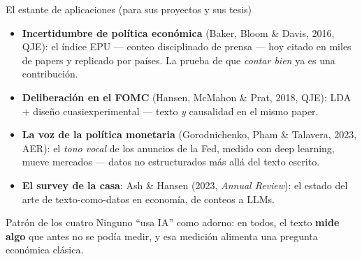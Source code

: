 \documentclass{beamer}
\newcommand{\1}{\mathbb{I}}
\begin{document}
\begin{frame}{El estante de aplicaciones (para sus proyectos y sus tesis)}
\small
\begin{itemize}\itemsep5pt
  \item \textbf{Incertidumbre de política económica} (Baker, Bloom \& Davis, 2016, QJE): el índice EPU --- conteo disciplinado de prensa --- hoy citado en miles de papers y replicado por países. La prueba de que \emph{contar bien} ya es una contribución. \pause
  \item \textbf{Deliberación en el FOMC} (Hansen, McMahon \& Prat, 2018, QJE): LDA $+$ diseño cuasiexperimental --- texto \emph{y} causalidad en el mismo paper. \pause
  \item \textbf{La voz de la política monetaria} (Gorodnichenko, Pham \& Talavera, 2023, AER): el \emph{tono vocal} de los anuncios de la Fed, medido con deep learning, mueve mercados --- datos no estructurados más allá del texto escrito. \pause
  \item \textbf{El survey de la casa}: Ash \& Hansen (2023, \emph{Annual Review}): el estado del arte de texto-como-datos en economía, de conteos a LLMs.
\end{itemize}
\pause

\vspace{0.1cm}
\begin{block}{Patrón de los cuatro}
Ninguno ``usa IA'' como adorno: en todos, el texto \textbf{mide algo} que antes no se podía medir, y esa medición alimenta una pregunta económica clásica.
\end{block}
\end{frame}
\end{document}
